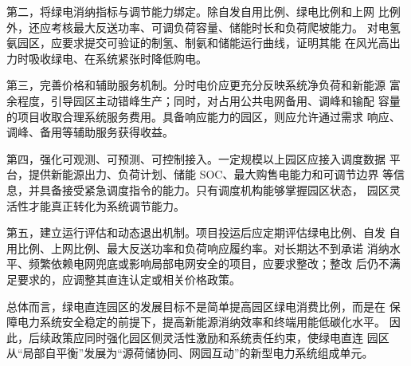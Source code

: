 第二，将绿电消纳指标与调节能力绑定。除自发自用比例、绿电比例和上网
比例外，还应考核最大反送功率、可调负荷容量、储能时长和负荷爬坡能力。
对电氢氨园区，应要求提交可验证的制氢、制氨和储能运行曲线，证明其能
在风光高出力时吸收绿电、在系统紧张时降低购电。

第三，完善价格和辅助服务机制。分时电价应更充分反映系统净负荷和新能源
富余程度，引导园区主动错峰生产；同时，对占用公共电网备用、调峰和输配
容量的项目收取合理系统服务费用。具备响应能力的园区，则应允许通过需求
响应、调峰、备用等辅助服务获得收益。

第四，强化可观测、可预测、可控制接入。一定规模以上园区应接入调度数据
平台，提供新能源出力、负荷计划、储能 SOC、最大购售电能力和可调节边界
等信息，并具备接受紧急调度指令的能力。只有调度机构能够掌握园区状态，
园区灵活性才能真正转化为系统调节能力。

第五，建立运行评估和动态退出机制。项目投运后应定期评估绿电比例、自发
自用比例、上网比例、最大反送功率和负荷响应履约率。对长期达不到承诺
消纳水平、频繁依赖电网兜底或影响局部电网安全的项目，应要求整改；整改
后仍不满足要求的，应调整其直连认定或相关价格政策。

总体而言，绿电直连园区的发展目标不是简单提高园区绿电消费比例，而是在
保障电力系统安全稳定的前提下，提高新能源消纳效率和终端用能低碳化水平。
因此，后续政策应同时强化园区侧灵活性激励和系统责任约束，使绿电直连
园区从“局部自平衡”发展为“源荷储协同、网园互动”的新型电力系统组成单元。